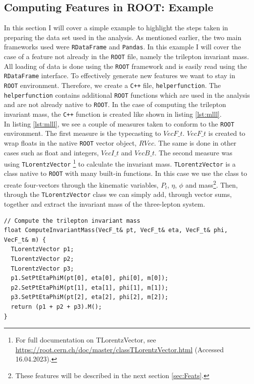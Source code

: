 \subsection{Computing Features in ROOT: Example}
In this section I will cover a simple example to highlight the steps taken in preparing the data set 
used in the analysis. As mentioned earlier, the two main frameworks used were \verb!RDataFrame! and \verb!Pandas!. 
In this example I will cover the case of a feature not already in the \verb!ROOT! file, namely the trilepton
invariant mass. All loading of data is done using the \verb!ROOT! framework and is easily read using the
\verb!RDataFrame! interface. To effectively generate new features we want to stay in \verb!ROOT! environment. Therefore,
we create a \verb!C++! file, \texttt{helperfunction}. The \texttt{helperfunction} contains additional 
\verb!ROOT! functions which are used in the analysis and are not already native to \verb!ROOT!. In the case 
of computing the trilepton invariant mass, the \verb!C++! function is created like shown in listing 
\ref{lst:mlll}.
\\
In listing \ref{lst:mlll}, we see a couple of measures taken to conform to the \verb!ROOT! environment. The first measure is 
the typecasting to $VecF\_t$. $VecF\_t$ is created to wrap floats in the native \verb!ROOT! vector object, $RVec$. 
The same is done in other cases such as float and integers, $VecI\_t$ and $VecB\_t$. The second measure
was using \verb!TLorentzVector! \footnote{For full documentation on TLorentzVector, see \url{https://root.cern.ch/doc/master/classTLorentzVector.html} (Accessed 16.04.2023).} 
to calculate the invariant mass. \verb!TLorentzVector! is a class native to \verb!ROOT! with many built-in functions. In 
this case we use the class to create four-vectors through the kinematic variables, $P_t$, $\eta$, $\phi$ and mass\footnote{These features
will be described in the next section \ref{sec:Feats}.}. Then, through the \verb!TLorentzVector! class we can simply add, through vector sums, 
together and extract the invariant mass of the three-lepton system. 
\lstset{style=Cpp}
\begin{lstlisting}[caption={$C{++}$-function which implementes the calculation of the trilepton invariant mass.},captionpos=b, label={lst:mlll}]
// Compute the trilepton invariant mass 
float ComputeInvariantMass(VecF_t& pt, VecF_t& eta, VecF_t& phi, VecF_t& m) {
  TLorentzVector p1;
  TLorentzVector p2;
  TLorentzVector p3;
  p1.SetPtEtaPhiM(pt[0], eta[0], phi[0], m[0]);
  p2.SetPtEtaPhiM(pt[1], eta[1], phi[1], m[1]);
  p3.SetPtEtaPhiM(pt[2], eta[2], phi[2], m[2]);
  return (p1 + p2 + p3).M();
}
\end{lstlisting}
